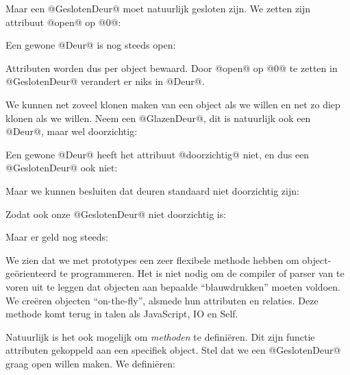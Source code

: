 
Maar een @GeslotenDeur@ moet natuurlijk gesloten zijn. We zetten zijn attribuut @open@ op @0@:


Een gewone @Deur@ is nog steeds open:


Attributen worden dus per object bewaard. Door @open@ op @0@ te zetten in @GeslotenDeur@ verandert er niks in @Deur@.

We kunnen net zoveel klonen maken van een object als we willen en net zo diep klonen als we willen. Neem een @GlazenDeur@, dit is natuurlijk ook een @Deur@, maar wel doorzichtig:


Een gewone @Deur@ heeft het attribuut @doorzichtig@ niet, en dus een @GeslotenDeur@ ook niet:


Maar we kunnen besluiten dat deuren standaard niet doorzichtig zijn:


Zodat ook onze @GeslotenDeur@ niet doorzichtig is:


Maar er geld nog steeds:


We zien dat we met prototypes een zeer flexibele methode hebben om object-geörienteerd te programmeren. Het is niet nodig om de compiler of parser van te voren uit te leggen dat objecten aan bepaalde ``blauwdrukken'' moeten voldoen. We creëren objecten ``on-the-fly'', alsmede hun attributen en relaties. Deze methode komt terug in talen als JavaScript, IO en Self.

Natuurlijk is het ook mogelijk om \emph{methoden} te definiëren. Dit zijn functie attributen gekoppeld aan een specifiek object. Stel dat we een @GeslotenDeur@ graag open willen maken. We definiëren:

